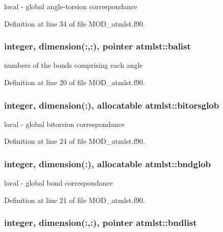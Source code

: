 local -\/ global angle-\/torsion correspondance 



Definition at line 34 of file M\-O\-D\-\_\-atmlst.\-f90.

\hypertarget{classatmlst_a7a0a8658bb6a68244435c4cbb82b34f2}{
\subsubsection[{balist}]{\setlength{\rightskip}{0pt plus 5cm}integer, dimension(\-:,\-:), pointer atmlst\-::balist}}\label{classatmlst_a7a0a8658bb6a68244435c4cbb82b34f2}


numbers of the bonds comprising each angle 



Definition at line 20 of file M\-O\-D\-\_\-atmlst.\-f90.

\hypertarget{classatmlst_a03c51dbd08b70e4f7a2c697a4caf07e2}{
\subsubsection[{bitorsglob}]{\setlength{\rightskip}{0pt plus 5cm}integer, dimension(\-:), allocatable atmlst\-::bitorsglob}}\label{classatmlst_a03c51dbd08b70e4f7a2c697a4caf07e2}


local -\/ global bitorsion correspondance 



Definition at line 24 of file M\-O\-D\-\_\-atmlst.\-f90.

\hypertarget{classatmlst_a0b08d7cce39564c92ee3bfda3ef116b1}{
\subsubsection[{bndglob}]{\setlength{\rightskip}{0pt plus 5cm}integer, dimension(\-:), allocatable atmlst\-::bndglob}}\label{classatmlst_a0b08d7cce39564c92ee3bfda3ef116b1}


local -\/ global bond correspondance 



Definition at line 21 of file M\-O\-D\-\_\-atmlst.\-f90.

\hypertarget{classatmlst_a9137df3d6e7537ac04cb92835864b79d}{
\subsubsection[{bndlist}]{\setlength{\rightskip}{0pt plus 5cm}integer, dimension(\-:,\-:), pointer atmlst\-::bndlist}}\label{classatmlst_a9137df3d6e7537ac04cb92835864b79d}


